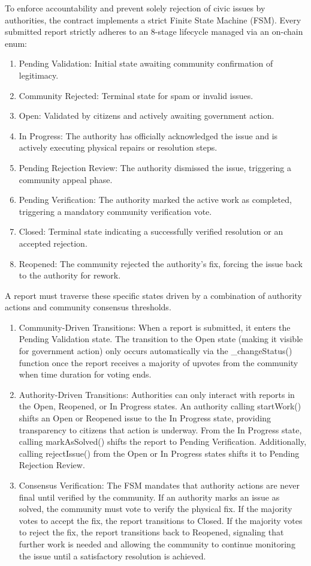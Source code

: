 To enforce accountability and prevent solely rejection of civic issues by authorities, the contract implements a strict Finite State Machine (\ac{FSM}). Every submitted report strictly adheres to an 8-stage lifecycle managed via an on-chain enum:
\begin{enumerate}
    \item Pending Validation: Initial state awaiting community confirmation of legitimacy.
    \item Community Rejected: Terminal state for spam or invalid issues.
    \item Open: Validated by citizens and actively awaiting government action.
    \item In Progress: The authority has officially acknowledged the issue and is actively executing physical repairs or resolution steps.
    \item Pending Rejection Review: The authority dismissed the issue, triggering a community appeal phase.
    \item Pending Verification: The authority marked the active work as completed, triggering a mandatory community verification vote.
    \item Closed: Terminal state indicating a successfully verified resolution or an accepted rejection.
    \item Reopened: The community rejected the authority's fix, forcing the issue back to the authority for rework.
\end{enumerate}

A report must traverse these specific states driven by a combination of authority actions and community consensus thresholds.
\begin{enumerate}
    \item Community-Driven Transitions: When a report is submitted, it enters the Pending Validation state. The transition to the Open state (making it visible for government action) only occurs automatically via the \_changeStatus() function once the report receives a majority of upvotes from the community when time duration for voting ends.
    \item Authority-Driven Transitions: Authorities can only interact with reports in the Open, Reopened, or In Progress states. An authority calling startWork() shifts an Open or Reopened issue to the In Progress state, providing transparency to citizens that action is underway. From the In Progress state, calling markAsSolved() shifts the report to Pending Verification. Additionally, calling rejectIssue() from the Open or In Progress states shifts it to Pending Rejection Review.
    \item Consensus Verification: The FSM mandates that authority actions are never final until verified by the community. If an authority marks an issue as solved, the community must vote to verify the physical fix. If the majority votes to accept the fix, the report transitions to Closed. If the majority votes to reject the fix, the report transitions back to Reopened, signaling that further work is needed and allowing the community to continue monitoring the issue until a satisfactory resolution is achieved.
\end{enumerate}

